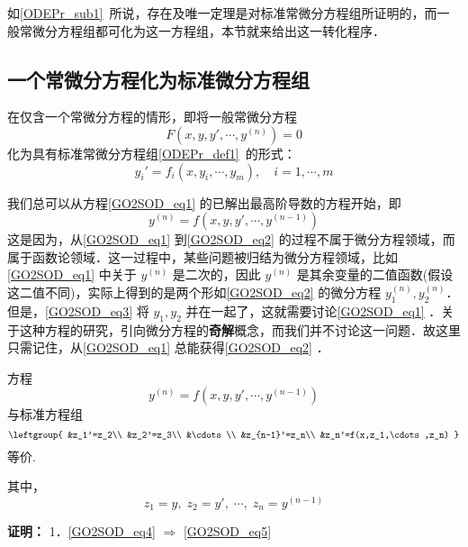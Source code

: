 
如\autoref{ODEPr_sub1}~所说，存在及唯一定理是对标准常微分方程组所证明的，而一般常微分方程组都可化为这一方程组，本节就来给出这一转化程序．

\subsection{一个常微分方程化为标准微分方程组}
在仅含一个常微分方程的情形，即将一般常微分方程
\begin{equation}\label{GO2SOD_eq1}
F(x,y,y',\cdots,y^{(n)})=0
\end{equation}
化为具有标准常微分方程组\autoref{ODEPr_def1}~的形式：
\begin{equation}\label{GO2SOD_eq3}
y_i'=f_i(x,y_i,\cdots,y_m),\quad i=1,\cdots,m
\end{equation}

我们总可以从方程\autoref{GO2SOD_eq1} 的已解出最高阶导数的方程开始，即
\begin{equation}\label{GO2SOD_eq2}
y^{(n)}=f(x,y,y',\cdots,y^{(n-1)})
\end{equation}
这是因为，从\autoref{GO2SOD_eq1} 到\autoref{GO2SOD_eq2} 的过程不属于微分方程领域，而属于函数论领域．这一过程中，某些问题被归结为微分方程领域，比如\autoref{GO2SOD_eq1} 中关于 $y^{(n)}$ 是二次的，因此 $y^{(n)}$ 是其余变量的二值函数(假设这二值不同)，实际上得到的是两个形如\autoref{GO2SOD_eq2} 的微分方程 $y_1^{(n)},y_2^{(n)}$．但是，\autoref{GO2SOD_eq3} 将 $y_1,y_2$ 并在一起了，这就需要讨论\autoref{GO2SOD_eq1} ．关于这种方程的研究，引向微分方程的\textbf{奇解}概念，而我们并不讨论这一问题．故这里只需记住，从\autoref{GO2SOD_eq1} 总能获得\autoref{GO2SOD_eq2} ．
\begin{theorem}{}\label{GO2SOD_the1}
方程
\begin{equation}\label{GO2SOD_eq4}
y^{(n)}=f(x,y,y',\cdots,y^{(n-1)})
\end{equation}
与标准方程组
\begin{equation}\label{GO2SOD_eq5}
\leftgroup{
&z_1'=z_2\\
&z_2'=z_3\\
&\cdots\\
&z_{n-1}'=z_n\\
&z_n'=f(x,z_1,\cdots,z_n)
}
\end{equation}
等价.

其中，
\begin{equation}\label{GO2SOD_eq6}
z_1=y,\;z_2=y',\;\cdots,\;z_n=y^{(n-1)}
\end{equation}
\end{theorem}
\textbf{证明：}
1．\autoref{GO2SOD_eq4} $\Rightarrow$ \autoref{GO2SOD_eq5} 


